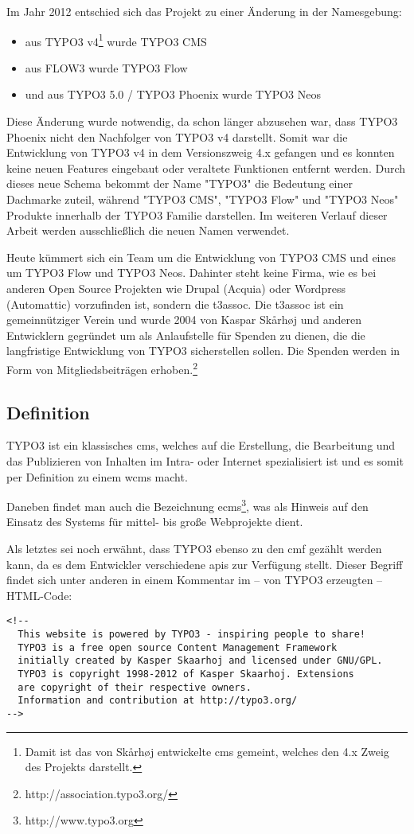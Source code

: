 Im Jahr 2012 entschied sich das Projekt zu einer Änderung in der Namesgebung:
\begin{itemize}
  \item aus TYPO3 v4\footnote{Damit ist das von Skårhøj entwickelte \gls{cms} gemeint, welches den 4.x Zweig des Projekts darstellt.} wurde TYPO3 CMS
  \item aus FLOW3 wurde TYPO3 Flow
  \item und aus TYPO3 5.0 / TYPO3 Phoenix wurde TYPO3 Neos
\end{itemize}

Diese Änderung wurde notwendig, da schon länger abzusehen war, dass TYPO3 Phoenix nicht den Nachfolger von TYPO3 v4 darstellt. Somit war die Entwicklung von TYPO3 v4 in dem Versionszweig 4.x gefangen und es konnten keine neuen Features eingebaut oder veraltete Funktionen entfernt werden. Durch dieses neue Schema bekommt der Name "TYPO3" die Bedeutung einer Dachmarke zuteil, während "TYPO3 CMS", "TYPO3 Flow" und "TYPO3 Neos" Produkte innerhalb der TYPO3 Familie darstellen. Im weiteren Verlauf dieser Arbeit werden ausschließlich die neuen Namen verwendet.

Heute kümmert sich ein Team um die Entwicklung von TYPO3 CMS und eines um TYPO3 Flow und TYPO3 Neos. Dahinter steht keine Firma, wie es bei anderen Open Source Projekten wie Drupal (Acquia) oder Wordpress (Automattic) vorzufinden ist, sondern die \gls{t3assoc}. Die \gls{t3assoc} ist ein gemeinnütziger Verein und wurde 2004 von Kaspar Skårhøj und anderen Entwicklern gegründet um als Anlaufstelle für Spenden zu dienen, die die langfristige Entwicklung von TYPO3 sicherstellen sollen. Die Spenden werden in Form von Mitgliedsbeiträgen erhoben.\footnote{http://association.typo3.org/}

\subsection{Definition}
TYPO3 ist ein klassisches \gls{cms}, welches auf die Erstellung, die Bearbeitung und das Publizieren von Inhalten im Intra- oder Internet spezialisiert ist und es somit per Definition zu einem \gls{wcms} macht.

Daneben findet man auch die Bezeichnung \gls{ecms}\footnote{http://www.typo3.org}, was als Hinweis auf den Einsatz des Systems für mittel- bis große Webprojekte dient.

Als letztes sei noch erwähnt, dass TYPO3 ebenso zu den \gls{cmf} gezählt werden kann, da es dem Entwickler verschiedene \gls{api}s zur Verfügung stellt. Dieser Begriff findet sich unter anderen in einem Kommentar im – von TYPO3 erzeugten – HTML-Code:
\begin{verbatim}
<!-- 
  This website is powered by TYPO3 - inspiring people to share!
  TYPO3 is a free open source Content Management Framework
  initially created by Kasper Skaarhoj and licensed under GNU/GPL.
  TYPO3 is copyright 1998-2012 of Kasper Skaarhoj. Extensions
  are copyright of their respective owners.
  Information and contribution at http://typo3.org/
-->
\end{verbatim}

